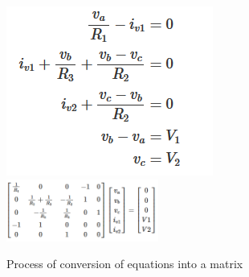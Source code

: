 \documentclass[a4paper, titlepage]{article}
\begin{document}
    \begin{figure}[htp]
        \centering
        \includegraphics[width=.2\textwidth,scale=1]{Equations}
        \includegraphics[width=50mm,scale=1]{Matrix}
        \caption{Process of conversion of equations into a matrix \cite{nodeanalysis}}
        \label{fig:figure3}
    \end{figure}

    \pagebreak
\end{document}
